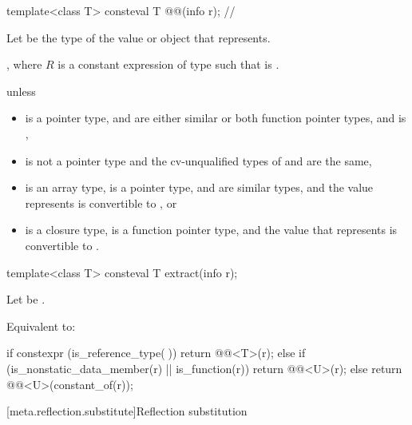 \begin{itemdecl}
template<class T>
  consteval T @@(info r);    // \expos
\end{itemdecl}

\begin{itemdescr}
\pnum
Let  be the type of the value or object that  represents.

\pnum
\returns
{},
where $R$ is a constant expression of type 
such that  is .

\pnum
\throws
{} unless
\begin{itemize}
\item
   is a pointer type,
   and  are either similar
  or both function pointer types, and
   is ,
\item
   is not a pointer type
  and the cv-unqualified types of  and  are the same,
\item
   is an array type,
   is a pointer type,
   and  are similar types, and
  the value  represents is convertible to , or
\item
   is a closure type,
   is a function pointer type, and
  the value that  represents is convertible to .
\end{itemize}
\end{itemdescr}

%
\begin{itemdecl}
template<class T>
  consteval T extract(info r);
\end{itemdecl}

\begin{itemdescr}
\pnum
Let  be .

\pnum
\effects
Equivalent to:
\begin{codeblock}
if constexpr (is_reference_type(^^T)) {
  return @@<T>(r);
} else if (is_nonstatic_data_member(r) || is_function(r)) {
  return @@<U>(r);
} else {
  return @@<U>(constant_of(r));
}
\end{codeblock}
\end{itemdescr}

[meta.reflection.substitute]{Reflection substitution}

